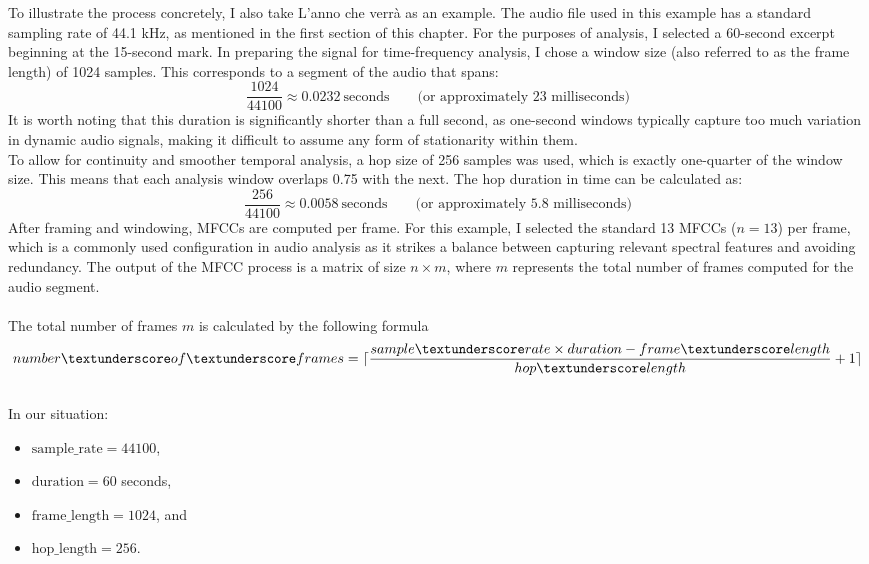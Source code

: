 To illustrate the process concretely, I also take L'anno che verrà as an example. The audio file used in this example has a standard sampling rate of 44.1 kHz, as mentioned in the first section of this chapter. For the purposes of analysis, I selected a 60-second excerpt beginning at the 15-second mark. In preparing the signal for time-frequency analysis, I chose a window size (also referred to as the frame length) of 1024 samples. This corresponds to a segment of the audio that spans:\\
$$
	\frac{1024}{44100}\approx0.0232 \ \text{seconds} \qquad \text{(or approximately 23 milliseconds)}
$$
It is worth noting that this duration is significantly shorter than a full second, as one-second windows typically capture too much variation in dynamic audio signals, making it difficult to assume any form of stationarity within them.\\
To allow for continuity and smoother temporal analysis, a hop size of 256 samples was used, which is exactly one-quarter of the window size. This means that each analysis window overlaps 0.75 with the next. The hop duration in time can be calculated as:\\
$$
	\frac{256}{44100}\approx0.0058 \ \text{seconds} \qquad \text{(or approximately 5.8 milliseconds)}
$$
After framing and windowing, MFCCs are computed per frame. For this example, I selected the standard 13 MFCCs ($n=13$) per frame, which is a commonly used configuration in audio analysis as it strikes a balance between capturing relevant spectral features and avoiding redundancy. The output of the MFCC process is a matrix of size $n \times m$, where $m$ represents the total number of frames computed for the audio segment.\\
\\
The total number of frames $m$ is calculated by the following formula
\begin{equation}
	number\textunderscore of\textunderscore frames=\lceil \frac{sample\textunderscore rate \times duration-frame \textunderscore length}{hop\textunderscore length}+1 \rceil
	\label{windownumber}
\end{equation}\\
In our situation:
\begin{itemize}
	\item $\text{sample\_rate} = 44100$,
	\item $\text{duration} = 60$ seconds,
	\item $\text{frame\_length} = 1024$, and
	\item $\text{hop\_length} = 256$.
\end{itemize}
